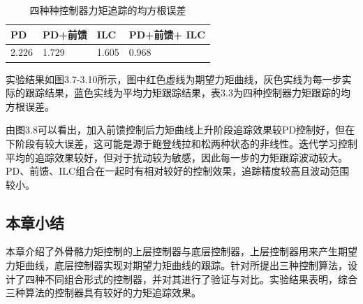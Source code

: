 \begin{table}[htb]
    \caption[控制参数]{四种种控制器力矩追踪的均方根误差}
    \begin{tabular}{llll}
      \toprule
        PD & PD+前馈 & ILC & PD+前馈+ ILC \\
      \midrule
        2.226 & 1.729 & 1.605 & 0.968 \\
      \bottomrule
    \end{tabular}
\end{table}

实验结果如图3.7-3.10所示，图中红色虚线为期望力矩曲线，灰色实线为每一步实际的跟踪结果，蓝色实线为平均力矩跟踪结果，表3.3为四种控制器力矩跟踪的均方根误差。

由图3.8可以看出，加入前馈控制后力矩曲线上升阶段追踪效果较PD控制好，但在下阶段有较大误差，这可能是源于鲍登线拉和松两种状态的非线性。迭代学习控制平均的追踪效果较好，但对于扰动较为敏感，因此每一步的力矩跟踪波动较大。PD、前馈、ILC组合在一起时有相对较好的控制效果，追踪精度较高且波动范围较小。

\subsection{本章小结}

本章介绍了外骨骼力矩控制的上层控制器与底层控制器，上层控制器用来产生期望力矩曲线，底层控制器实现对期望力矩曲线的跟踪。针对所提出三种控制算法，设计了四种不同组合形式的控制器，并对其进行了验证与对比。实验结果表明，综合三种算法的控制器具有较好的力矩追踪效果。